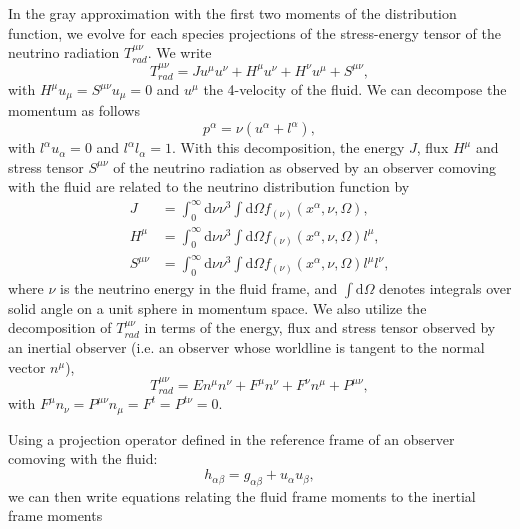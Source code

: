 In the gray approximation with the first two moments of the distribution function, we evolve for each species projections of the stress-energy tensor of the neutrino radiation $T^{\mu\nu}_{rad}$. We write
%
\begin{equation}
T^{\mu\nu}_{rad}  = Ju^\mu u^\nu + H^\mu u^\nu + H^\nu u^\mu + S^{\mu\nu},
\end{equation}
%
with $H^\mu u_\mu = S^{\mu\nu}u_\mu = 0$ and $u^\mu$ the 4-velocity of the fluid. We can decompose the momentum as follows
%
\begin{equation}
  p^\alpha = \nu(u^\alpha + l^\alpha),
\end{equation}
%
with $l^\alpha u_\alpha = 0$ and $l^\alpha l_\alpha = 1$. With this decomposition, the energy $J$, flux $H^\mu$ and stress tensor $S^{\mu\nu}$ of the neutrino radiation as observed by an observer comoving with the fluid are related to the neutrino distribution function by
%
\begin{align}
  J &= \int^\infty_0 \mathrm{d}\nu \nu^3 \int \mathrm{d}\Omega f_{(\nu)}(x^{\alpha}, \nu, \Omega), \\
  H^\mu &= \int^\infty_0 \mathrm{d}\nu \nu^3 \int \mathrm{d}\Omega f_{(\nu)}(x^{\alpha}, \nu, \Omega) l^{\mu},\\
  S^{\mu\nu} &= \int^\infty_0 \mathrm{d}\nu \nu^3 \int \mathrm{d}\Omega f_{(\nu)}(x^{\alpha}, \nu, \Omega) l^{\mu}l^\nu,
\end{align}
%
where $\nu$ is the neutrino energy in the fluid frame, and $\int\mathrm{d}\Omega$ denotes integrals over solid angle on a unit sphere in momentum space.
%
%
We also utilize the decomposition of $T^{\mu\nu}_{rad}$ in terms of the energy, flux and stress tensor observed by an inertial observer (i.e. an observer whose worldline is tangent to the normal vector $n^\mu$),
%
\begin{equation}
  T^{\mu\nu}_{rad} = En^\mu n^\nu + F^\mu n^\nu + F^\nu n^\mu + P^{\mu\nu},
\end{equation}
%
with $F^\mu n_\nu = P^{\mu\nu}n_\mu = F^t = P^{t\nu} = 0$.%

Using a projection operator defined in the reference frame of an observer comoving with the fluid:
%
\begin{equation}
  h_{\alpha\beta} = g_{\alpha\beta} + u_\alpha u_\beta,
\end{equation}
%
we can then write equations relating the fluid frame moments to the inertial frame moments

